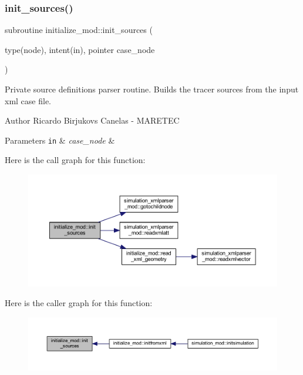 \subsubsection{\texorpdfstring{init\+\_\+sources()}{init\_sources()}}
{\footnotesize\ttfamily subroutine initialize\+\_\+mod\+::init\+\_\+sources (\begin{DoxyParamCaption}\item[{type(node), intent(in), pointer}]{case\+\_\+node }\end{DoxyParamCaption})\hspace{0.3cm}{\ttfamily [private]}}



Private source definitions parser routine. Builds the tracer sources from the input xml case file. 

\begin{DoxyAuthor}{Author}
Ricardo Birjukovs Canelas -\/ M\+A\+R\+E\+T\+EC 
\end{DoxyAuthor}

\begin{DoxyParams}[1]{Parameters}
\mbox{\tt in}  & {\em case\+\_\+node} & \\
\hline
\end{DoxyParams}
Here is the call graph for this function\+:\nopagebreak
\begin{figure}[H]
\begin{center}
\leavevmode
\includegraphics[width=350pt]{namespaceinitialize__mod_aae6a35bca190cdf65a6146f254264cd1_cgraph}
\end{center}
\end{figure}
Here is the caller graph for this function\+:\nopagebreak
\begin{figure}[H]
\begin{center}
\leavevmode
\includegraphics[width=350pt]{namespaceinitialize__mod_aae6a35bca190cdf65a6146f254264cd1_icgraph}
\end{center}
\end{figure}
\mbox{\label{namespaceinitialize__mod_a107012ffec69fe2d7c524d240193439e}} 
